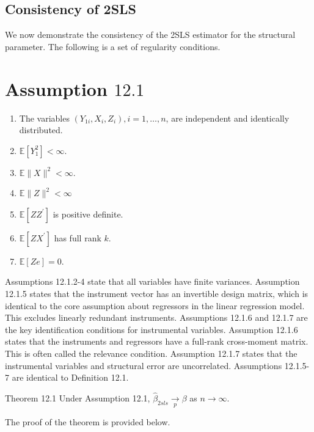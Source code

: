 \documentclass[10pt]{article}
\begin{document}
\subsection{Consistency of 2SLS}
We now demonstrate the consistency of the 2SLS estimator for the structural parameter. The following is a set of regularity conditions.

\section{Assumption $12.1$}
\begin{enumerate}
  \item The variables $\left(Y_{1 i}, X_{i}, Z_{i}\right), i=1, \ldots, n$, are independent and identically distributed.

  \item $\mathbb{E}\left[Y_{1}^{2}\right]<\infty$.

  \item $\mathbb{E}\|X\|^{2}<\infty$.

  \item $\mathbb{E}\|Z\|^{2}<\infty$

  \item $\mathbb{E}\left[Z Z^{\prime}\right]$ is positive definite.

  \item $\mathbb{E}\left[Z X^{\prime}\right]$ has full rank $k$.

  \item $\mathbb{E}[Z e]=0$.

\end{enumerate}
Assumptions 12.1.2-4 state that all variables have finite variances. Assumption 12.1.5 states that the instrument vector has an invertible design matrix, which is identical to the core assumption about regressors in the linear regression model. This excludes linearly redundant instruments. Assumptions 12.1.6 and 12.1.7 are the key identification conditions for instrumental variables. Assumption 12.1.6 states that the instruments and regressors have a full-rank cross-moment matrix. This is often called the relevance condition. Assumption 12.1.7 states that the instrumental variables and structural error are uncorrelated. Assumptions 12.1.5-7 are identical to Definition 12.1.

Theorem 12.1 Under Assumption 12.1, $\widehat{\beta}_{2 s l s} \underset{p}{\longrightarrow} \beta$ as $n \rightarrow \infty$.

The proof of the theorem is provided below.
\end{document}

